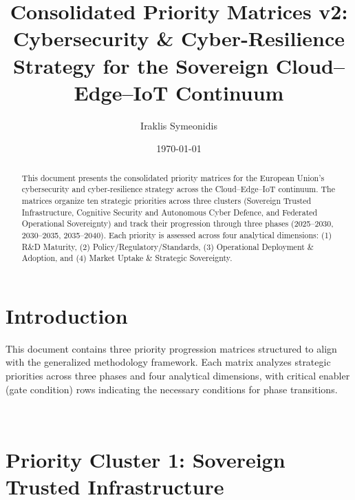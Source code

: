 \documentclass[10pt]{article}
\title{Consolidated Priority Matrices v2:\\Cybersecurity \& Cyber-Resilience Strategy for the Sovereign Cloud--Edge--IoT Continuum}
\author{Iraklis Symeonidis}
\date{\today}
\begin{document}
\maketitle

\begin{abstract}
This document presents the consolidated priority matrices for the European Union's cybersecurity and cyber-resilience strategy across the Cloud--Edge--IoT continuum. The matrices organize ten strategic priorities across three clusters (Sovereign Trusted Infrastructure, Cognitive Security and Autonomous Cyber Defence, and Federated Operational Sovereignty) and track their progression through three phases (2025--2030, 2030--2035, 2035--2040). Each priority is assessed across four analytical dimensions: (1) R\&D Maturity, (2) Policy/Regulatory/Standards, (3) Operational Deployment \& Adoption, and (4) Market Uptake \& Strategic Sovereignty.
\end{abstract}

\tableofcontents

\newpage

\section{Introduction}

This document contains three priority progression matrices structured to align with the generalized methodology framework. Each matrix analyzes strategic priorities across three phases and four analytical dimensions, with critical enabler (gate condition) rows indicating the necessary conditions for phase transitions.

~\\


\section{Priority Cluster 1: Sovereign Trusted Infrastructure}

\end{document}
